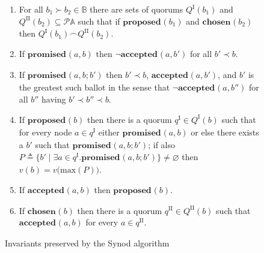 \documentclass[journal]{IEEEtran}
\begin{document}
\def\prep#1{\mathbf{prepare}(#1)}
\def\mprom#1#2#3{\mathbf{promised}_{\ge #1}(#2,#3)}
\def\fprom#1#2#3{\mathbf{promised}_{#1}(#2,#3)}
\def\bprom#1#2#3#4{\mathbf{promised}_{#1}(#2,#3;#4)}
\def\prop#1#2{\mathbf{proposed}_{#1}(#2)}
\def\acc#1#2#3{\mathbf{accepted}_{#1}(#2,#3)}
\def\chosen#1#2{\mathbf{chosen}_{#1}(#2)}
\def\owner#1{\mathrm{owner}(#1)}

\begin{figure*}[t!]
\caption{Invariants preserved by the Synod algorithm\label{synod-invariants-figure}}

\vspace{3mm}

\renewcommand{\theenumi}{S\arabic{enumi}}

\begin{enumerate}

\item \label{synod-quorums} For all $b_1 \succ b_2 \in \mathbb B$ there are
  sets of quorums $Q^\textrm{I}(b_1)$ and $Q^\textrm{II}(b_2) \subseteq
  \mathcal P \mathbb A$ such that if $\prop{}{b_1}$ and $\chosen{}{b_2}$ then
  ${Q^\textrm{I}(b_1) \frown Q^\textrm{II}(b_2)}$.

\item \label{synod-fprom} If $\fprom{}{a}{b}$ then $\neg\acc{}{a}{b'}$ for all
  ${b' \prec b}$.

\item \label{synod-bprom} If $\bprom{}{a}{b}{b'}$ then $b' \prec b$,
  $\acc{}{a}{b'}$, and $b'$ is the greatest such ballot in the sense that
  $\neg\acc{}{a}{b''}$ for all $b''$ having $b' \prec b'' \prec b$.

\item \label{synod-prop} If $\prop{}{b}$ then there is a quorum $q^\textrm{I}
  \in Q^\textrm{I}(b)$ such that for every node $a \in q^\textrm{I}$ either
  $\fprom{}{a}{b}$ or else there exists a $b'$ such that $\bprom{}{a}{b}{b'}$;
  if also ${P \triangleq \{ b' \mid \exists a \in q^\textrm{I}.
  \bprom{}{a}{b}{b'} \} \ne \varnothing}$ then $v(b) =
  v\bigl(\mathrm{max}(P)\bigr)$.

\item \label{synod-acc} If $\acc{}{a}{b}$ then $\prop{}{b}$.

\item \label{synod-chosen} If $\chosen{}{b}$ then there is a quorum
  $q^\textrm{II} \in Q^\textrm{II}(b)$ such that $\acc{}{a}{b}$ for every $a
  \in q^\textrm{II}$.

\end{enumerate}
\end{figure*}
\end{document}
